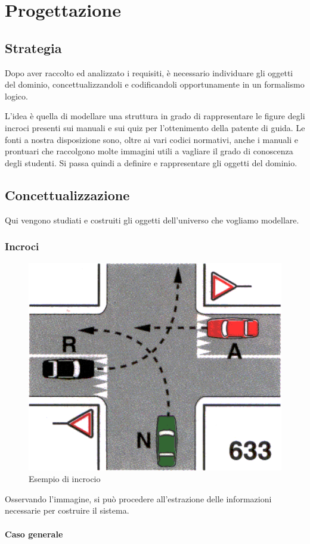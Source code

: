 \chapter{Progettazione}

\section{Strategia}
Dopo aver raccolto ed analizzato i requisiti, è necessario individuare gli oggetti del dominio, concettualizzandoli e codificandoli opportunamente in un formalismo logico.

L'idea è quella di modellare una struttura in grado di rappresentare le figure degli incroci presenti sui manuali e sui quiz per l'ottenimento della patente di guida. Le fonti a nostra disposizione sono, oltre ai vari codici normativi, anche i manuali e prontuari che raccolgono molte immagini utili a vagliare il grado di conoscenza degli studenti. Si passa quindi a definire e rappresentare gli oggetti del dominio.

\section{Concettualizzazione}
Qui vengono studiati e costruiti gli oggetti dell'universo che vogliamo modellare.

\subsection{Incroci}

\begin{figure}[htb]
	\centering
	\includegraphics[width=.5\textwidth]{images/example}
	\caption{Esempio di incrocio}
	\label{fig:inc}
\end{figure}


Osservando l'immagine, si può procedere all'estrazione delle informazioni necessarie per costruire il sistema.

\subsubsection{Caso generale}

